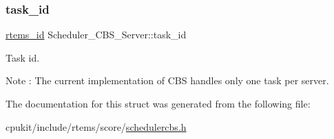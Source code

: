 \subsubsection{\texorpdfstring{task\_id}{task\_id}}
{\footnotesize\ttfamily \mbox{\hyperlink{group__ClassicTasks_gab20892b814dced7dd4e5b9bf42becd57}{rtems\+\_\+id}} Scheduler\+\_\+\+C\+B\+S\+\_\+\+Server\+::task\+\_\+id}

Task id.

\begin{DoxyNote}{Note}
\+: The current implementation of C\+BS handles only one task per server. 
\end{DoxyNote}


The documentation for this struct was generated from the following file\+:\begin{DoxyCompactItemize}
\item 
cpukit/include/rtems/score/\mbox{\hyperlink{schedulercbs_8h}{schedulercbs.\+h}}\end{DoxyCompactItemize}
